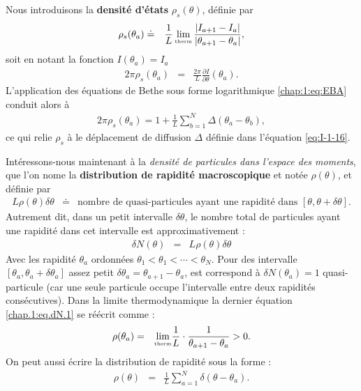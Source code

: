 Nous introduisons la {\bf densité d’états}  \( \rho_s(\theta) \), définie par
\begin{eqnarray}
	 \rho_s(\theta_a) &\doteq & \frac{1}{L} \lim_{\text{\tiny therm}} \frac{|I_{a+1} - I_a|}{|\theta_{a+1} - \theta_a|},
\end{eqnarray}
soit en notant la fonction \( I(\theta_a) = I_a \)
\begin{eqnarray}
	2\pi \rho_s(\theta_a) &=&  \frac{2\pi}{L} \frac{\partial I}{\partial \theta}(\theta_a).
\end{eqnarray}
L’application des équations de Bethe sous forme logarithmique \eqref{chap:1:eq:EBA} conduit alors à
\begin{eqnarray}
	2\pi \rho_s(\theta_a) = 1 + \frac{1}{L} \sum_{b = 1}^N \Delta(\theta_a - \theta_b),
\end{eqnarray}
ce qui relie \( \rho_s \) à le déplacement de diffusion  \( \Delta \) définie dans l'équation  \eqref{eq:I-1-16}.

\medskip

Intéressons-nous maintenant à la {\em densité de particules dans l’espace des moments}, que l'on nome la {\bf distribution de rapidité macroscopique} et notée \( \rho(\theta) \), et définie par
\begin{eqnarray}
	L \rho(\theta) \delta \theta & \doteq & \mbox{nombre de quasi-particules ayant une rapidité dans } [\theta , \theta + \delta \theta].	
\end{eqnarray}
Autrement dit, dans un petit intervalle $\delta \theta $, le nombre total de particules ayant une rapidité dans cet intervalle est approximativement :
\begin{eqnarray}\label{chap.1:eq.dN.1}
	\delta N (\theta ) & = & L \rho (\theta) \delta \theta 	
\end{eqnarray}
Avec les rapidité $\theta_a$ ordonnées \ie $\theta_1 < \theta_1 < \cdots < \theta_N$. Pour des intervalle $[\theta_a , \theta_a + \delta \theta_a]$ assez petit $\delta \theta_a = \theta_{a+1} - \theta_a$, est correspond à $\delta N (\theta_a) = 1 $ quasi-particule (car une seule particule occupe l’intervalle entre deux rapidités consécutives). Dans la limite thermodynamique la dernier équation \eqref{chap.1:eq.dN.1} se réécrit comme :
\begin{eqnarray}
	\rho(\theta_a) & = & \underset{\text{\tiny therm}}{\lim} \frac{1}{L} \cdot \frac{1}{\theta_{a+1} - \theta_a} > 0.
\end{eqnarray}
On peut aussi écrire la distribution de rapidité sous la forme :
\begin{eqnarray}
	\rho(\theta) & = & \frac{1}{L} \sum_{a = 1}^N \delta ( \theta - \theta_a ) .	
\end{eqnarray}

